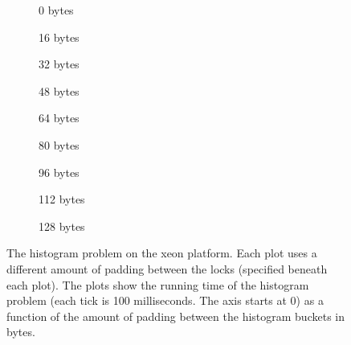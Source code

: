 \begin{figure}[hbpt]
	\graphicspath{{plots/}}
	\begin{subfigure}{0.32\textwidth}
		
		\caption{0 bytes}
	\end{subfigure}
	\begin{subfigure}{0.32\textwidth}
		
		\caption{16 bytes}
	\end{subfigure}
	\begin{subfigure}{0.32\textwidth}
		
		\caption{32 bytes}
	\end{subfigure}
	\begin{subfigure}{0.32\textwidth}
		
		\caption{48 bytes}
	\end{subfigure}
	\begin{subfigure}{0.32\textwidth}
		
		\caption{64 bytes}
	\end{subfigure}
	\begin{subfigure}{0.32\textwidth}
		
		\caption{80 bytes}
	\end{subfigure}
	\begin{subfigure}{0.32\textwidth}
		
		\caption{96 bytes}
	\end{subfigure}
	\begin{subfigure}{0.32\textwidth}
		
		\caption{112 bytes}
	\end{subfigure}
	\begin{subfigure}{0.32\textwidth}
		
		\caption{128 bytes}
	\end{subfigure}
	\caption{The histogram problem on the xeon platform. Each plot uses a
	different amount of padding between the locks (specified beneath each
	plot). The plots show the running time of the histogram problem (each
	tick is 100 milliseconds. The axis starts at 0) as a function of the amount of padding between
	the histogram buckets in bytes.}
\end{figure}
